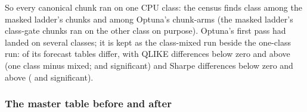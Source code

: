 So every canonical chunk ran on one CPU class: the census finds \campHChunkClasses{} class
among the masked ladder's \campHChunks{} chunks and \campCChunkClasses{} among Optuna's
\campCChunks{} chunk-arms (the masked ladder's \campHGateChunks{} class-gate chunks ran on
the other class on purpose). Optuna's first pass had landed on several classes; it is kept as the class-mixed
run beside the one-class run: \campSMDiffer{} of its \campSMN{} forecast tables differ, with
\campSMQBelow{} QLIKE differences below zero and \campSMQAbove{} above (one class minus mixed;
\campSMQBelowSig{} and \campSMQAboveSig{} significant) and \campSMSBelow{} Sharpe
differences below zero and \campSMSAbove{} above (\campSMSBelowSig{} and
\campSMSAboveSig{} significant).

\begin{table}[H]
\centering
\caption{CPU-class checks: what was compared and what reproduced. ``Bit-identical $a/b$'':
$a$ of $b$ items equal bit for bit; relative differences are of the forecast; QLIKE and
Sharpe differences (other class minus the fleet's class, in \% of QLIKE and Sharpe units)
as point estimates.}
\label{tab:app_camp_repro}
\campfit{\small}
\end{table}

\subsubsection{The master table before and after}
\label{sec:app_camp_master}

